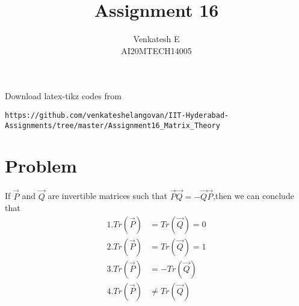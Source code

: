 \documentclass[journal,12pt]{IEEEtran}
\begin{document}
     \def\rightbox#1{\makebox[0in][r]{#1}}
     \def\centbox#1{\makebox[0in]{#1}}
     \def\topbox#1{\raisebox{-\baselineskip}[0in][0in]{#1}}
     \def\midbox#1{\raisebox{-0.5\baselineskip}[0in][0in]{#1}}
\vspace{3cm}
\title{Assignment 16}
\author{Venkatesh E\\AI20MTECH14005}
\maketitle
\bigskip
\renewcommand{\thefigure}{\theenumi}
\renewcommand{\thetable}{\theenumi}
Download latex-tikz codes from 
\begin{lstlisting}
https://github.com/venkateshelangovan/IIT-Hyderabad-Assignments/tree/master/Assignment16_Matrix_Theory
\end{lstlisting}
\section{\textbf{Problem}}
If $\vec{P}$ and $\vec{Q}$ are invertible matrices such that   
$\vec{P}\vec{Q} = -\vec{Q}\vec{P}$,then we can conclude that
\begin{align}
1. Tr(\vec{P})&=Tr(\vec{Q})=0 \label{1}\\
2. Tr(\vec{P})&=Tr(\vec{Q})=1 \label{2}\\
3. Tr(\vec{P})&=-Tr(\vec{Q}) \label{3}\\
4. Tr(\vec{P}) &\neq Tr(\vec{Q}) \label{4}
\end{align}
\end{document}
